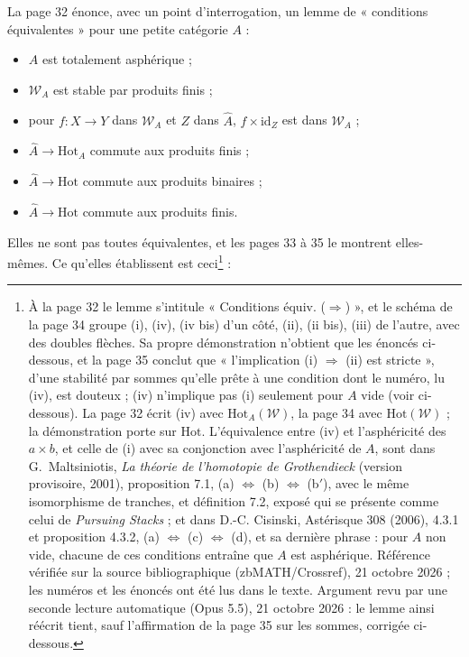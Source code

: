 \documentclass[11pt,a4paper]{article}
\begin{document}
La page 32 énonce, avec un point d'interrogation, un lemme de « conditions
équivalentes » pour une petite catégorie $A$ :
\begin{itemize}
\item[(i)] $A$ est totalement asphérique ;
\item[(ii)] $\mathcal{W}_{A}$ est stable par produits finis ;
\item[(ii bis)] pour $f : X \to Y$ dans $\mathcal{W}_{A}$ et $Z$ dans
$\widehat{A}$, $f \times \mathrm{id}_{Z}$ est dans $\mathcal{W}_{A}$ ;
\item[(iii)] $\widehat{A} \to \mathrm{Hot}_{A}$ commute aux produits finis ;
\item[(iv)] $\widehat{A} \to \mathrm{Hot}$ commute aux produits binaires ;
\item[(iv bis)] $\widehat{A} \to \mathrm{Hot}$ commute aux produits finis.
\end{itemize}
Elles ne sont pas toutes équivalentes, et les pages 33 à 35 le montrent
elles-mêmes. Ce qu'elles établissent est ceci\footnote{À la page 32 le lemme
s'intitule « Conditions équiv. ($\Rightarrow$) », et le schéma de la page 34
groupe (i), (iv), (iv bis) d'un côté, (ii), (ii bis), (iii) de l'autre, avec
des doubles flèches. Sa propre démonstration n'obtient que les énoncés
ci-dessous, et la page 35 conclut que « l'implication (i) $\Rightarrow$ (ii) est stricte », d'une stabilité par sommes qu'elle prête à une condition dont le numéro, lu (iv), est douteux ; (iv) n'implique pas (i) seulement pour $A$ vide (voir ci-dessous). La page 32 écrit
(iv) avec $\mathrm{Hot}_{A}(\mathcal{W})$, la page 34 avec
$\mathrm{Hot}(\mathcal{W})$ ; la démonstration porte sur
$\mathrm{Hot}$. L'équivalence entre (iv) et l'asphéricité des $a \times b$, et
celle de (i) avec sa conjonction avec l'asphéricité de $A$, sont dans
G.~Maltsiniotis, \emph{La théorie de l'homotopie de Grothendieck} (version
provisoire, 2001), proposition 7.1, (a) $\Leftrightarrow$ (b)
$\Leftrightarrow$ (b$'$), avec le même isomorphisme de tranches, et
définition 7.2, exposé qui se présente comme celui de \emph{Pursuing
Stacks} ; et dans D.-C. Cisinski, Astérisque 308 (2006), 4.3.1 et proposition
4.3.2, (a) $\Leftrightarrow$ (c) $\Leftrightarrow$ (d), et sa dernière phrase : pour $A$ non vide, chacune de ces conditions entraîne que $A$ est asphérique. Référence vérifiée sur la source bibliographique (zbMATH/Crossref), 21 octobre 2026 ; les numéros et les énoncés ont été lus dans le texte. Argument revu par une seconde lecture automatique (Opus 5.5), 21 octobre 2026 : le lemme ainsi réécrit tient, sauf l'affirmation de la page 35 sur les sommes, corrigée ci-dessous.} :
\end{document}
